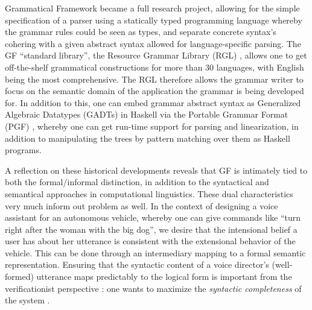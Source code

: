 \documentclass[a4paper, 11pt]{article}
\begin{document}
Grammatical Framework became a full research project, allowing for the simple
specification of a parser using a statically typed programming language whereby
the grammar rules could be seen as types, and separate concrete syntax's
cohering with a given abstract syntax allowed for language-specific parsing. The
GF ``standard library'', the Resource Grammar Library (RGL) \cite{ranta2009rgl},
allows one to get off-the-shelf grammatical constructions for more than 30
languages, with English being the most comprehensive. The RGL therefore allows
the grammar writer to focus on the semantic domain of the application the
grammar is being developed for. In addition to this, one can embed grammar
abstract syntax as Generalized Algebraic Datatypes (GADTs) in Haskell via the
Portable Grammar Format (PGF) \cite{angelov2010pgf}, whereby one can get
run-time support for parsing and linearization, in addition to manipulating the
trees by pattern matching over them as Haskell programs.

A reflection on these historical developments reveals that GF is intimately tied
to both the formal/informal distinction, in addition to the syntactical and
semantical approaches in computational linguistics. These dual characteristics
very much inform out problem as well. In the context of designing a voice
assistant for an autonomous vehicle, whereby one can give commands like ``turn
right after the woman with the big dog'', we desire that the intensional belief a
user has about her utterance is consistent with the extensional behavior of the
vehicle. This can be done through an intermediary mapping to a formal semantic
representation. Ensuring that the syntactic content of a voice director's
(well-formed) utterance maps predictably to the logical form is important from
the verificationist perspective : one wants to maximize the \emph{syntactic
completeness} of the system \cite{macmillan2021}.
\end{document}
